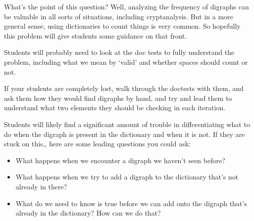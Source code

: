 \begin{questionmeta}
What's the point of this question? Well, analyzing the frequency of digraphs can be valuable in all sorts of situations, including cryptanalysis. But in a more general sense, using dictionaries to count things is very common. So hopefully this problem will give students some guidance on that front.

Students will probably need to look at the doc tests to fully understand the problem, including what we mean by `valid' and whether spaces should count or not. 

If your students are completely lost, walk through the doctests with them, and ask them how they would find digraphs by hand, and try and lead them to understand what two elements they should be checking in each iteration.

Students will likely find a significant amount of trouble in differentiating what to do when the digraph is present in the dictionary and when it is not. If they are stuck on this,, here are some leading questions you could ask: 
\begin{itemize}
    \item What happens when we encounter a digraph we haven't seen before?
    \item What happens when we try to add a digraph to the dictionary that's not already in there? 
    \item What do we need to know is true before we can add onto the digraph that's already in the dictionary? How can we do that? 
\end{itemize}

\end{questionmeta}